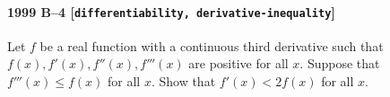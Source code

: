 \paragraph{1999 B--4 \textnormal{[\texttt{differentiability, derivative-inequality}]}}
Let $f$ be a real function with a continuous third derivative such that $f(x),
f'(x), f''(x), f'''(x)$ are positive for all $x$. Suppose that
$f'''(x)\leq f(x)$ for all $x$. Show that $f'(x)<2f(x)$ for all $x$.
